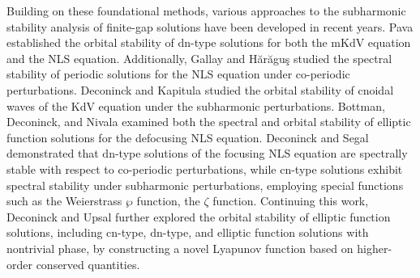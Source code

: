 \documentclass[11pt,reqno]{amsart}
\newcommand{\cn}{\mathrm{cn}}
\newcommand{\dn}{\mathrm{dn}}
\numberwithin{equation}{section}
\begin{document}
Building on these foundational methods, various approaches to the subharmonic stability analysis of finite-gap solutions have been developed in recent years.
Pava \cite{Pava-07} established the orbital stability of $\dn$-type solutions for both the mKdV equation and the NLS equation. 
Additionally, Gallay and H\u{a}r\u{a}gu\c{s} \cite{KapitulaH-07-small,KapitulaH-07-per} studied the spectral stability of periodic solutions for the NLS equation under co-periodic perturbations. Deconinck and Kapitula \cite{DeconinckK-10} studied the orbital stability of cnoidal waves of the KdV equation under the subharmonic perturbations.
Bottman, Deconinck, and Nivala \cite{BottmanDN-11} examined both the spectral and orbital stability of elliptic function solutions for the defocusing NLS equation.
Deconinck and Segal \cite{DeconinckS-17} demonstrated that $\dn$-type solutions of the focusing NLS equation are spectrally stable with respect to co-periodic perturbations, while $\cn$-type solutions exhibit spectral stability under subharmonic perturbations, employing special functions such as the Weierstrass $\wp$ function, the $\zeta$ function.  
Continuing this work, Deconinck and Upsal \cite{DeconinckyU-20} further explored the orbital stability of elliptic function solutions, including $\cn$-type, $\dn$-type, and elliptic function solutions with nontrivial phase, by constructing a novel Lyapunov function based on higher-order conserved quantities.
\end{document}
